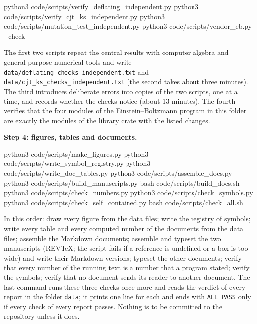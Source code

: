\documentclass[
  10pt,
]{article}
\newenvironment{Shaded}{}{}
\newcommand{\AttributeTok}[1]{\textcolor[rgb]{0.49,0.56,0.16}{#1}}
\newcommand{\ExtensionTok}[1]{#1}
\newcommand{\FunctionTok}[1]{\textcolor[rgb]{0.02,0.16,0.49}{#1}}
\newcommand{\NormalTok}[1]{#1}
\begin{document}
\begin{Shaded}
\begin{Highlighting}[]
\ExtensionTok{python3}\NormalTok{ code/scripts/verify\_deflating\_independent.py}
\ExtensionTok{python3}\NormalTok{ code/scripts/verify\_cjt\_ks\_independent.py}
\ExtensionTok{python3}\NormalTok{ code/scripts/mutation\_test\_independent.py}
\ExtensionTok{python3}\NormalTok{ code/scripts/vendor\_eb.py }\AttributeTok{{-}{-}check}
\end{Highlighting}
\end{Shaded}

The first two scripts repeat the central results with computer algebra
and general-purpose numerical tools and write
\texttt{data/deflating\_checks\_independent.txt} and
\texttt{data/cjt\_ks\_checks\_independent.txt} (the second takes about
three minutes). The third introduces deliberate errors into copies of
the two scripts, one at a time, and records whether the checks notice
(about 13 minutes). The fourth verifies that the four modules of the
Einstein--Boltzmann program in this folder are exactly the modules of
the library crate with the listed changes.

\textbf{Step 4: figures, tables and documents.}

\begin{Shaded}
\begin{Highlighting}[]
\ExtensionTok{python3}\NormalTok{ code/scripts/make\_figures.py}
\ExtensionTok{python3}\NormalTok{ code/scripts/write\_symbol\_registry.py}
\ExtensionTok{python3}\NormalTok{ code/scripts/write\_doc\_tables.py}
\ExtensionTok{python3}\NormalTok{ code/scripts/assemble\_docs.py}
\ExtensionTok{python3}\NormalTok{ code/scripts/build\_manuscripts.py}
\FunctionTok{bash}\NormalTok{    code/scripts/build\_docs.sh}
\ExtensionTok{python3}\NormalTok{ code/scripts/check\_numbers.py}
\ExtensionTok{python3}\NormalTok{ code/scripts/check\_symbols.py}
\ExtensionTok{python3}\NormalTok{ code/scripts/check\_self\_contained.py}
\FunctionTok{bash}\NormalTok{    code/scripts/check\_all.sh}
\end{Highlighting}
\end{Shaded}

In this order: draw every figure from the data files; write the registry
of symbols; write every table and every computed number of the documents
from the data files; assemble the Markdown documents; assemble and
typeset the two manuscripts (REVTeX; the script fails if a reference is
undefined or a box is too wide) and write their Markdown versions;
typeset the other documents; verify that every number of the running
text is a number that a program stated; verify the symbols; verify that
no document sends its reader to another document. The last command runs
these three checks once more and reads the verdict of every report in
the folder \texttt{data}; it prints one line for each and ends with
\texttt{ALL\ PASS} only if every check of every report passes. Nothing
is to be committed to the repository unless it does.
\end{document}
